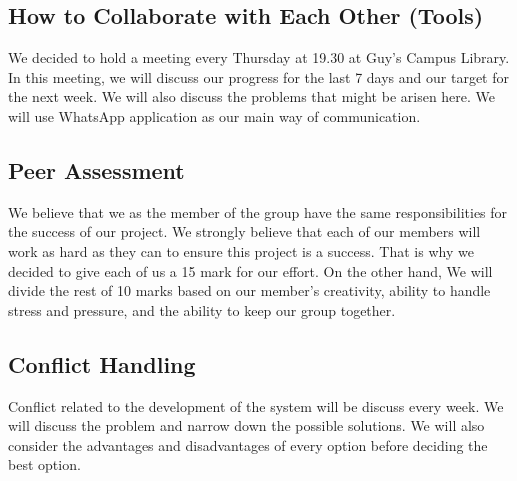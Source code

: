 \documentclass[a4paper]{article}
\begin{document}
\subsection{How to Collaborate with Each Other (Tools)}

We decided to hold a meeting every Thursday at 19.30 at Guy's Campus Library. In this meeting, we will discuss our progress for the last 7 days and our target for the next week. We will also discuss the problems that might be arisen here. We will use WhatsApp application as our main way of communication. 

\subsection{Peer Assessment}

We believe that we as the member of the group have the same responsibilities for the success of our project. We strongly believe that each of our members will work as hard as they can to ensure this project is a success. That is why we decided to give each of us a 15 mark for our effort. On the other hand, We will divide the rest of 10 marks based on our member's creativity, ability to handle stress and pressure, and the ability to keep our group together.

\subsection{Conflict Handling}

Conflict related to the development of the system will be discuss every week. We will discuss the problem and narrow down the possible solutions. We will also consider the advantages and disadvantages of every option before deciding the best option. 
\end{document}
